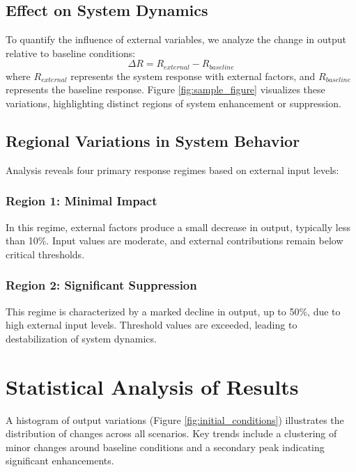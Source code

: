     \subsection{Effect on System Dynamics}
    To quantify the influence of external variables, we analyze the change in output relative to baseline conditions:
    \begin{equation}\label{delta_output}
        \Delta R = R_{external} - R_{baseline}
    \end{equation}
    where $R_{external}$ represents the system response with external factors, and $R_{baseline}$ represents the baseline response. Figure \ref{fig:sample_figure} visualizes these variations, highlighting distinct regions of system enhancement or suppression.


    \subsection{Regional Variations in System Behavior}
    Analysis reveals four primary response regimes based on external input levels:
    \subsubsection*{Region 1: Minimal Impact}
    In this regime, external factors produce a small decrease in output, typically less than 10\%. Input values are moderate, and external contributions remain below critical thresholds.

    \subsubsection*{Region 2: Significant Suppression}
    This regime is characterized by a marked decline in output, up to 50\%, due to high external input levels. Threshold values are exceeded, leading to destabilization of system dynamics.



\section{Statistical Analysis of Results}
    A histogram of output variations (Figure \ref{fig:initial_conditions}) illustrates the distribution of changes across all scenarios. Key trends include a clustering of minor changes around baseline conditions and a secondary peak indicating significant enhancements.

